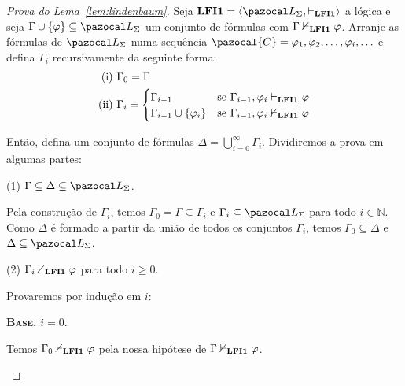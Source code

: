     \begin{proof}[Prova do Lema~\ref{lem:lindenbaum}]
        Seja $\lfium{} = \langle \ling, \conhil \rangle$ a lógica \lfium{} e seja $\Gamma \cup \{\phi\} \subseteq \ling$ um conjunto de fórmulas com $\Gamma \nvdash_{{\normalfont\textbf{LFI1}}{}} \varphi$. Arranje as fórmulas de $\ling$ numa sequência $\pazocal{C} = \phi_1, \phi_2, \ldots, \phi_i, \ldots$ e defina $\Gamma_i$ recursivamente da seguinte forma:
        \begin{align*}
                \text{(i)}~&\Gamma_0 = \Gamma\\
                \text{(ii)}~&\Gamma_i =
                \begin{cases}
                    \Gamma_{i - 1} &\text{se}~ \Gamma_{i - 1}, \varphi_i \vdash_{{\normalfont\textbf{LFI1}}{}} \varphi\\
                    \Gamma_{i - 1} \cup \{\varphi_i\} &\text{se}~ \Gamma_{i - 1}, \varphi_i \nvdash_{{\normalfont\textbf{LFI1}}{}} \varphi
                \end{cases}
        \end{align*}

        Então, defina um conjunto de fórmulas $\Delta = \bigcup_{i=0}^{\infty}\Gamma_i$. Dividiremos a prova em algumas partes:
        
        \begin{adjustwidth}{1cm}{}
            \noindent(1) $\Gamma \subseteq \Delta \subseteq \ling$.

                Pela construção de $\Gamma_i$, temos $\Gamma_0 = \Gamma \subseteq \Gamma_i$ e $\Gamma_i \subseteq \ling$ para todo $i \in \mathbb{N}$. Como $\Delta$ é formado a partir da união de todos os conjuntos $\Gamma_i$, temos $\Gamma_0 \subseteq \Delta$ e $\Delta \subseteq \ling$.

            \noindent(2) $\Gamma_i \nvdash_{{\normalfont\textbf{LFI1}}{}} \varphi$ para todo $i \geq 0$.

            Provaremos por indução em $i$:

            \begin{adjustwidth}{1cm}{}
                \noindent\textbf{\textsc{Base.}} $i = 0$.
                
                \begin{adjustwidth}{1cm}{}
                    
                    Temos $\Gamma_0 \nvdash_{{\normalfont\textbf{LFI1}}{}} \varphi$ pela nossa hipótese de $\Gamma \nvdash_{{\normalfont\textbf{LFI1}}{}} \varphi$.
                    
                \end{adjustwidth}
                

\end{adjustwidth}
\end{adjustwidth}
\end{proof}
